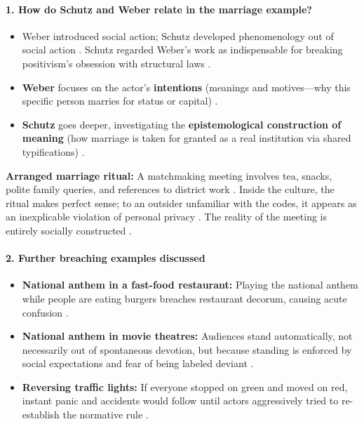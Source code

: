 \paragraph{1. How do Schutz and Weber relate in the marriage example?}
\begin{itemize}
    \item Weber introduced social action; Schutz developed phenomenology out of social action . Schutz regarded Weber's work as indispensable for breaking positivism's obsession with structural laws .
    \item \textbf{Weber} focuses on the actor's \textbf{intentions} (meanings and motives---why this specific person marries for status or capital) .
    \item \textbf{Schutz} goes deeper, investigating the \textbf{epistemological construction of meaning} (how marriage is taken for granted as a real institution via shared typifications) .
\end{itemize}

\begin{ExampleBox}
\textbf{Arranged marriage ritual:} A matchmaking meeting involves tea, snacks, polite family queries, and references to district work . Inside the culture, the ritual makes perfect sense; to an outsider unfamiliar with the codes, it appears as an inexplicable violation of personal privacy . The reality of the meeting is entirely socially constructed .
\end{ExampleBox}

\paragraph{2. Further breaching examples discussed}
\begin{ExampleBox}
\begin{itemize}
    \item \textbf{National anthem in a fast-food restaurant:} Playing the national anthem while people are eating burgers breaches restaurant decorum, causing acute confusion .
    \item \textbf{National anthem in movie theatres:} Audiences stand automatically, not necessarily out of spontaneous devotion, but because standing is enforced by social expectations and fear of being labeled deviant .
    \item \textbf{Reversing traffic lights:} If everyone stopped on green and moved on red, instant panic and accidents would follow until actors aggressively tried to re-establish the normative rule .
\end{itemize}
\end{ExampleBox}

